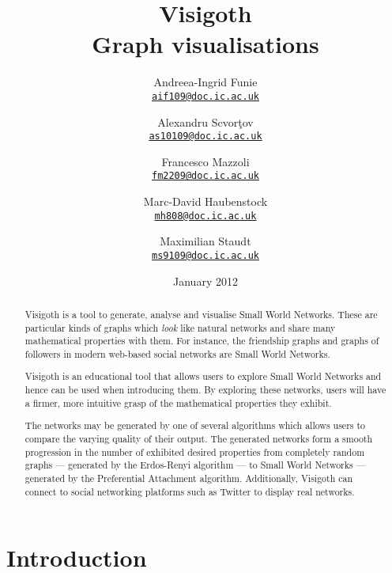 \documentclass[a4paper,11pt,titlepage]{article}
\let\stdhref\href
\renewcommand{\href}[2]{\stdhref{#1}{\texttt{#2}}}
\newcommand{\mailto}[1]{\href{mailto:#1}{#1}}
\let\stdsection\section         %
\renewcommand{\section}{\newpage\stdsection}
\begin{document}
\title{\Huge Visigoth\\\Large Graph visualisations}
\author{
  Andreea-Ingrid Funie\\\mailto{aif109@doc.ic.ac.uk}\and
  Alexandru Scvor\c tov\\\mailto{as10109@doc.ic.ac.uk}\and
  Francesco Mazzoli\\\mailto{fm2209@doc.ic.ac.uk}\and
  Marc-David Haubenstock\\\mailto{mh808@doc.ic.ac.uk}\and
  Maximilian Staudt\\\mailto{ms9109@doc.ic.ac.uk}
}
\date{January 2012}
\maketitle

\begin{abstract}

Visigoth is a tool to generate, analyse and visualise Small World
Networks. These are particular kinds of graphs which \emph{look} like
natural networks and share many mathematical properties with them.
For instance, the friendship graphs and graphs of followers in modern
web-based social networks are Small World Networks.

Visigoth is an educational tool that allows users to explore Small
World Networks and hence can be used when introducing them. By
exploring these networks, users will have a firmer, more intuitive
grasp of the mathematical properties they exhibit.

The networks may be generated by one of several algorithms which
allows users to compare the varying quality of their output. The
generated networks form a smooth progression in the number of
exhibited desired properties from completely random graphs ---
generated by the Erdos-Renyi algorithm --- to Small World Networks ---
generated by the Preferential Attachment algorithm. Additionally,
Visigoth can connect to social networking platforms such as Twitter to
display real networks.
\end{abstract}

\tableofcontents




\section{Introduction}

\end{document}

